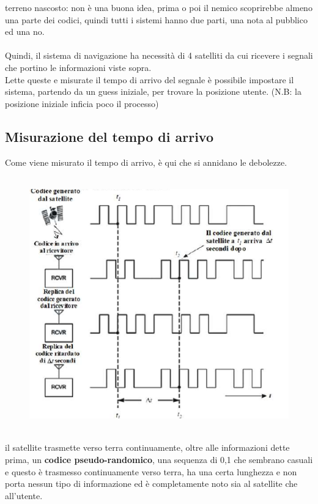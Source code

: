 \documentclass[oneside, 12pt]{extbook}
\begin{document}
terreno nascosto: non è una buona idea, prima o poi il nemico scoprirebbe almeno una parte dei codici, quindi tutti i sistemi hanno due parti, una nota al pubblico ed una no.\\\\
Quindi, il sistema di navigazione ha necessità di 4 satelliti da cui ricevere i segnali che portino le informazioni viste sopra.\\
Lette queste e misurate il tempo di arrivo del segnale è possibile impostare il sistema, partendo da un guess iniziale, per trovare la posizione utente. (N.B: la posizione iniziale inficia poco il processo)


\subsection{Misurazione del tempo di arrivo}
Come viene misurato il tempo di arrivo, è qui che si annidano le debolezze.\\\\
\begin{figure}[!h]
	\includegraphics[scale=0.4]{immagini/localization/rand_gen.png}
\end{figure}\\
il satellite trasmette verso terra continuamente, oltre alle informazioni dette prima, un \textbf{codice pseudo-randomico}, una sequenza di 0,1 che sembrano casuali e questo è trasmesso continuamente verso terra, ha una certa lunghezza e non porta nessun tipo di informazione ed è completamente noto sia al satellite che all'utente.\\
\end{document}
